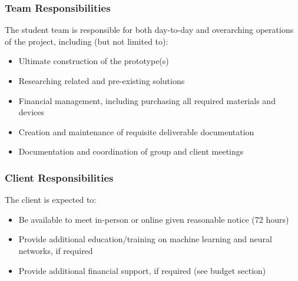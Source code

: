 \subsubsection{Team Responsibilities}
The student team is responsible for both day-to-day and overarching operations of the project, including (but not limited to):
\begin{itemize}
\item Ultimate construction of the prototype(s)
\item Researching related and pre-existing solutions
\item Financial management, including purchasing all required materials and devices
\item Creation and maintenance of requisite deliverable documentation
\item Documentation and coordination of group and client meetings
\end{itemize}
\subsubsection{Client Responsibilities}
The client is expected to:
\begin{itemize}
\item Be available to meet in-person or online given reasonable notice (72 hours)
\item Provide additional education/training on machine learning and neural networks, if required
\item Provide additional financial support, if required (see budget section)
\end{itemize}